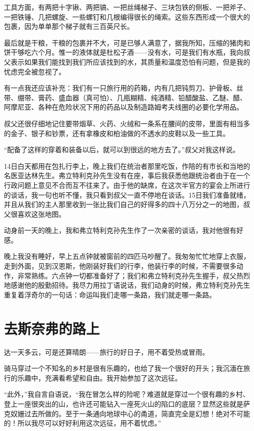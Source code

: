 \documentclass[10pt]{book}
\begin{document}
工具方面，有两把十字锹、两把镐、一把丝绳梯子、三块包铁的侧板、一把斧子、一把铁锤、几把螺旋、一些螺钉和几根编得很长的绳索。这些东西形成一个很大的包裹，因为单单那个梯子就有三百英尺长。

最后就是干粮，干粮的包裹并不大，可是已够人满意了，据我所知，压缩的猪肉和饼干够吃六个月。惟一的液体就是杜松子酒——没有水，可是我们有水瓶，我向叔父表示如果我们能找到我们所应该找到的水，其质量和温度恐怕有问题，但是我的忧虑完全被忽视了。

有一点我还应该补充：我们有一只旅行用的药箱，内有几把钝剪刀、护骨板、丝带、绷带、膏药、盛血器（真可怕）、几瓶糊精、纯酒精、铅醋酸盐、乙醚、醋、阿摩尼亚、各种在危险状况下用的药品以及制造路姆考夫线圈的必要化学用品。

叔父还很仔细地记住要带烟草、火药、火绒和一条系在腰间的皮带，里面有相当多的金子、银子和钞票，还有拿橡皮和柏油做的不透水的皮鞋以及一些工具。

“配备了这样的穿着和装备以后，就可以到很远的地方去了。”叔父对我这样说。

14日白天都用在包扎行李上，晚上我们在统治者那里吃饭，作陪的有市长和当地的名医亚达林先生。弗立特利克孙先生没有在座，事后我获悉他跟统治者由于在一个行政问题上意见不合而互不往来了。由于他的缺席，在这次半官方的宴会上所进行的谈话，我一句也听不懂，我只看到叔父一直不停地在谈话。15日我们准备就绪，并且从我们的主人那里收到一张比我们自己的好得多的四十八万分之一的地图，叔父很喜欢这张地图。

动身前一天的晚上，我和弗立特利克孙先生作了一次亲密的谈话，我对他很有好感。

晚上我没有睡好，早上五点钟就被窗前的四匹马吵醒了。我匆匆忙忙地穿上衣服，走到外面，见到汉恩斯，他刚装好我们的行李，他装行李的时候，不需要很多动作，非常熟练。六点钟一切都准备好了；我们和弗立特利克孙先生握手，叔父热烈地感谢他的殷勤招待。我尽力用拉丁语说话，我们动身的时候，弗立特利克孙先生重复着浮奇尔的一句话：命运叫我们走哪一条路，我们就走哪一条路。
\chapter{去斯奈弗的路上}
达一天多云，可是还算晴朗——旅行的好日子，用不着受热或冒雨。

骑马穿过一个不知名的乡村是很有乐趣的，也给了我一个很好的开头；我沉湎在旅行的乐趣中，充满看希望和自由。我开始参加了这次远征。

“此外，”我自言自语说，“我在冒怎么样的险呢？难道就是穿过一个很有趣的乡村、登上一座很突出的山，也许还可能钻入一座死火山的陷口的底层？显然这些就是萨克奴姗过去所做的。至于一条通向地球中心的甬道，简直完全是幻想！绝对不可能的！所以我尽可以好好利用这次远征，用不着忧虑。”
\end{document}
